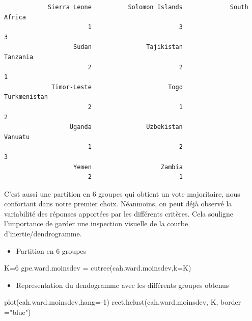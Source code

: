 \documentclass[
]{article}
\newenvironment{Shaded}{}{}
\newcommand{\AttributeTok}[1]{#1}
\newcommand{\DecValTok}[1]{#1}
\newcommand{\FunctionTok}[1]{#1}
\newcommand{\NormalTok}[1]{#1}
\newcommand{\OtherTok}[1]{\textcolor[rgb]{1.00,0.25,0.00}{#1}}
\newcommand{\SpecialCharTok}[1]{\textcolor[rgb]{0.00,0.50,0.50}{#1}}
\newcommand{\StringTok}[1]{\textcolor[rgb]{0.00,0.50,0.50}{#1}}
\providecommand{\tightlist}{%
  \setlength{\itemsep}{0pt}\setlength{\parskip}{0pt}}
\begin{document}
\begin{verbatim}
            Sierra Leone          Solomon Islands             South Africa 
                       1                        3                        3 
                   Sudan               Tajikistan                 Tanzania 
                       2                        2                        1 
             Timor-Leste                     Togo             Turkmenistan 
                       2                        1                        2 
                  Uganda               Uzbekistan                  Vanuatu 
                       1                        2                        3 
                   Yemen                   Zambia 
                       2                        1 
\end{verbatim}

C'est aussi une partition en 6 groupes qui obtient un vote majoritaire,
nous confortant dans notre premier choix. Néanmoins, on peut déjà
observé la variabilité des réponses apportées par les différents
critères. Cela souligne l'importance de garder une inspection visuelle
de la courbe d'inertie/dendrogramme.

\begin{itemize}
\tightlist
\item
  Partition en 6 groupes
\end{itemize}

\begin{Shaded}
\begin{Highlighting}[]
\NormalTok{K}\OtherTok{=}\DecValTok{6}
\NormalTok{gpe.ward.moinsdev }\OtherTok{=} \FunctionTok{cutree}\NormalTok{(cah.ward.moinsdev,}\AttributeTok{k=}\NormalTok{K)}
\end{Highlighting}
\end{Shaded}

\begin{itemize}
\tightlist
\item
  Representation du dendogramme avec les différents groupes obtenus
\end{itemize}

\begin{Shaded}
\begin{Highlighting}[]
\FunctionTok{plot}\NormalTok{(cah.ward.moinsdev,}\AttributeTok{hang=}\SpecialCharTok{{-}}\DecValTok{1}\NormalTok{)}
\FunctionTok{rect.hclust}\NormalTok{(cah.ward.moinsdev, K, }\AttributeTok{border =}\StringTok{"blue"}\NormalTok{)}
\end{Highlighting}
\end{Shaded}
\end{document}
